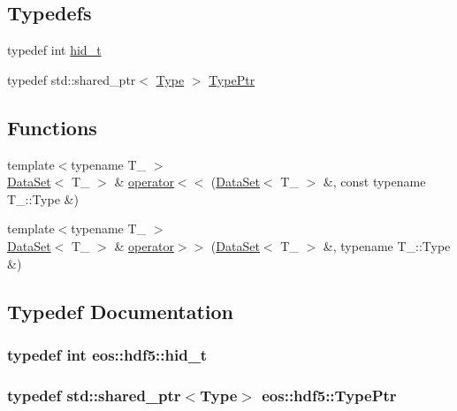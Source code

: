 \subsection*{Typedefs}
\begin{DoxyCompactItemize}
\item 
typedef int \hyperlink{namespaceeos_1_1hdf5_a5bd5e209f1bf36cdc5551465dacf2e74}{hid\_\-t}
\item 
typedef std::shared\_\-ptr$<$ \hyperlink{structeos_1_1hdf5_1_1Type}{Type} $>$ \hyperlink{namespaceeos_1_1hdf5_ac960ca8a290b8a26ab5f71585ac5d793}{TypePtr}
\end{DoxyCompactItemize}
\subsection*{Functions}
\begin{DoxyCompactItemize}
\item 
{\footnotesize template$<$typename T\_\- $>$ }\\\hyperlink{classeos_1_1hdf5_1_1DataSet}{DataSet}$<$ T\_\- $>$ \& \hyperlink{namespaceeos_1_1hdf5_a8da5ea7dae12acf02081ea4fc320dc3a}{operator$<$$<$} (\hyperlink{classeos_1_1hdf5_1_1DataSet}{DataSet}$<$ T\_\- $>$ \&, const typename T\_\-::Type \&)
\item 
{\footnotesize template$<$typename T\_\- $>$ }\\\hyperlink{classeos_1_1hdf5_1_1DataSet}{DataSet}$<$ T\_\- $>$ \& \hyperlink{namespaceeos_1_1hdf5_a59f5217285970b223b8a4932b811106e}{operator$>$$>$} (\hyperlink{classeos_1_1hdf5_1_1DataSet}{DataSet}$<$ T\_\- $>$ \&, typename T\_\-::Type \&)
\end{DoxyCompactItemize}


\subsection{Typedef Documentation}
\hypertarget{namespaceeos_1_1hdf5_a5bd5e209f1bf36cdc5551465dacf2e74}{
\subsubsection[{hid\_\-t}]{\setlength{\rightskip}{0pt plus 5cm}typedef int {\bf eos::hdf5::hid\_\-t}}}
\label{namespaceeos_1_1hdf5_a5bd5e209f1bf36cdc5551465dacf2e74}
\hypertarget{namespaceeos_1_1hdf5_ac960ca8a290b8a26ab5f71585ac5d793}{
\subsubsection[{TypePtr}]{\setlength{\rightskip}{0pt plus 5cm}typedef std::shared\_\-ptr$<${\bf Type}$>$ {\bf eos::hdf5::TypePtr}}}
\label{namespaceeos_1_1hdf5_ac960ca8a290b8a26ab5f71585ac5d793}


